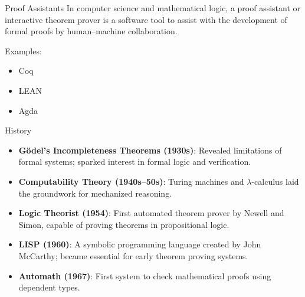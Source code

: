 \documentclass{beamer}
\begin{document}
\begin{frame}{Proof Assistants}
        In computer science and mathematical logic, a proof assistant or interactive theorem prover is a software tool to assist with the development of formal proofs by human–machine collaboration.\cite{wikipedia_proof_assistant} 

        Examples:
        \begin{itemize}
            \item Coq
            \item LEAN 
            \item Agda
        \end{itemize}
\end{frame}
\begin{frame}{History}
\begin{itemize}
  \item \textbf{Gödel’s Incompleteness Theorems (1930s)}: Revealed limitations of formal systems; sparked interest in formal logic and verification.

  \item \textbf{ Computability Theory (1940s–50s)}: Turing machines and $\lambda$-calculus laid the groundwork for mechanized reasoning.
\item \textbf{Logic Theorist (1954)}: First automated theorem prover by Newell and Simon, capable of proving theorems in propositional logic.

  \item \textbf{LISP (1960)}: A symbolic programming language created by John McCarthy; became essential for early theorem proving systems.

   \item \textbf{Automath (1967)}: First system to check mathematical proofs using dependent types.
 
  
\end{itemize}
\end{frame} 
\end{document}
